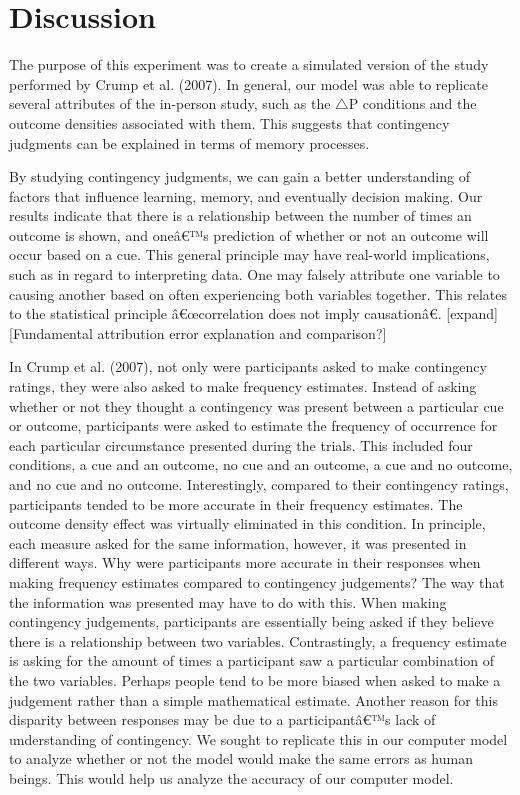 \documentclass[
  english,
  man,floatsintext]{apa6}
\begin{document}
\hypertarget{discussion}{%
\section{Discussion}\label{discussion}}

The purpose of this experiment was to create a simulated version of the study performed by Crump et al. (2007). In general, our model was able to replicate several attributes of the in-person study, such as the \(\triangle\)P conditions and the outcome densities associated with them. This suggests that contingency judgments can be explained in terms of memory processes.

By studying contingency judgments, we can gain a better understanding of factors that influence learning, memory, and eventually decision making. Our results indicate that there is a relationship between the number of times an outcome is shown, and oneâ€™s prediction of whether or not an outcome will occur based on a cue. This general principle may have real-world implications, such as in regard to interpreting data. One may falsely attribute one variable to causing another based on often experiencing both variables together. This relates to the statistical principle â€œcorrelation does not imply causationâ€. {[}expand{]}
{[}Fundamental attribution error explanation and comparison?{]}

In Crump et al. (2007), not only were participants asked to make contingency ratings, they were also asked to make frequency estimates. Instead of asking whether or not they thought a contingency was present between a particular cue or outcome, participants were asked to estimate the frequency of occurrence for each particular circumstance presented during the trials. This included four conditions, a cue and an outcome, no cue and an outcome, a cue and no outcome, and no cue and no outcome. Interestingly, compared to their contingency ratings, participants tended to be more accurate in their frequency estimates. The outcome density effect was virtually eliminated in this condition. In principle, each measure asked for the same information, however, it was presented in different ways. Why were participants more accurate in their responses when making frequency estimates compared to contingency judgements? The way that the information was presented may have to do with this. When making contingency judgements, participants are essentially being asked if they believe there is a relationship between two variables. Contrastingly, a frequency estimate is asking for the amount of times a participant saw a particular combination of the two variables. Perhaps people tend to be more biased when asked to make a judgement rather than a simple mathematical estimate. Another reason for this disparity between responses may be due to a participantâ€™s lack of understanding of contingency. We sought to replicate this in our computer model to analyze whether or not the model would make the same errors as human beings. This would help us analyze the accuracy of our computer model.
\end{document}
